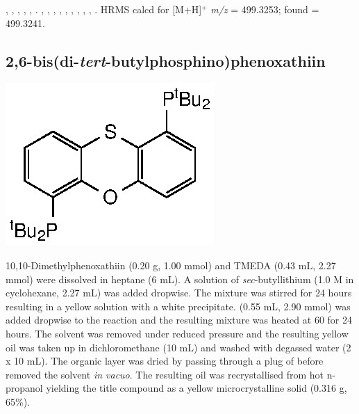 ,
,
,
,
,
.
,
,
,
,
,
,
,
,
,
.
HRMS calcd for  [M+H]$^+$ \emph{m/z} = 499.3253; found = 499.3241.


\subsection*{2,6-bis(di-\emph{tert}-butylphosphino)phenoxathiin}

\begin{structure}[h]
\begin{center}
\includegraphics{../Structures/Transthixantphos.eps}
\end{center}
\end{structure}

10,10-Dimethylphenoxathiin (0.20 g, 1.00 mmol) and TMEDA (0.43 mL, 2.27 mmol) were dissolved in heptane (6 mL).  A solution of \emph{sec}-butyllithium (1.0 M in cyclohexane, 2.27 mL) was added dropwise.  The mixture was stirred for 24 hours resulting in a yellow solution with a white precipitate.   (0.55 mL, 2.90 mmol) was added dropwise to the reaction and the resulting mixture was heated at 60 \degC{}  for 24 hours.  The solvent was removed under reduced pressure and the resulting yellow oil was taken up in dichloromethane (10 mL) and washed with degassed water (2 x 10 mL).  The organic layer was dried by passing through a plug of  before removed the solvent \emph{in vacuo}.  The resulting oil was recrystallised from hot n-propanol yielding the title compound as a yellow microcrystalline solid (0.316 g, 65\%).  

